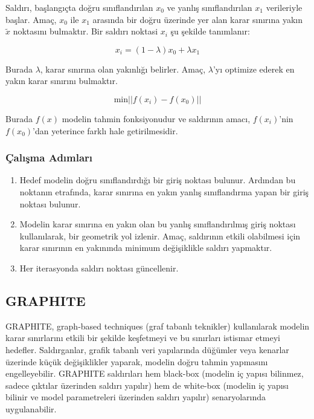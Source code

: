 Saldırı, başlangıçta doğru sınıflandırılan $x_0$ ve yanlış sınıflandırılan $x_1$ verileriyle başlar. Amaç, $x_0$ ile $x_1$ arasında bir doğru üzerinde yer alan karar sınırına yakın $\tilde{x}$ noktasını bulmaktır. Bir saldırı noktasi $x_i$ şu şekilde tanımlanır:

\[ x_i  = (1 - \lambda) x_0 + \lambda x_1 \]

Burada $\lambda$, karar sınırına olan yakınlığı belirler. Amaç, $\lambda$'yı optimize ederek en yakın karar sınırını bulmaktır.

\[ \text{min} || f(x_i) - f(x_0) || \]

Burada $f(x)$ modelin tahmin fonksiyonudur ve saldırının amacı, $f(x_i)$'nin $f(x_0)$'dan yeterince farklı hale getirilmesidir.

\subsubsection{Çalışma Adımları}

\begin{enumerate}
    \item Hedef modelin doğru sınıflandırdığı bir giriş noktası bulunur. Ardından bu noktanın etrafında, karar sınırına en yakın yanlış sınıflandırma yapan bir giriş noktası bulunur.
    \item Modelin karar sınırına en yakın olan bu yanlış sınıflandırılmış giriş noktası kullanılarak, bir geometrik yol izlenir. Amaç, saldırının etkili olabilmesi için karar sınırının en yakınında minimum değişiklikle saldırı yapmaktır.
    \item Her iterasyonda saldırı noktası güncellenir.
\end{enumerate}

\newpage

\subsection{GRAPHITE}

GRAPHITE, graph-based techniques (graf tabanlı teknikler) kullanılarak modelin karar sınırlarını etkili bir şekilde keşfetmeyi ve bu sınırları istismar etmeyi hedefler. Saldırganlar, grafik tabanlı veri yapılarında düğümler veya kenarlar üzerinde küçük değişiklikler yaparak, modelin doğru tahmin yapmasını engelleyebilir. GRAPHITE saldırıları hem black-box (modelin iç yapısı bilinmez, sadece çıktılar üzerinden saldırı yapılır) hem de white-box (modelin iç yapısı bilinir ve model parametreleri üzerinden saldırı yapılır) senaryolarında uygulanabilir.

